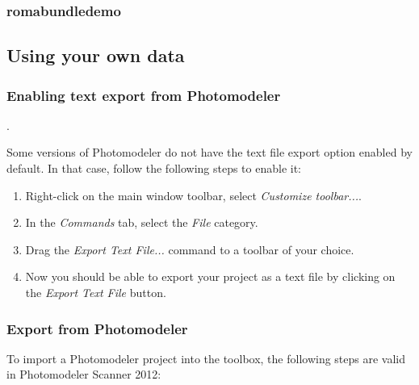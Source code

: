 \documentclass{article}
\begin{document}
\subsubsection{romabundledemo}

\newpage
\subsection{Using your own data}

\subsubsection{Enabling text export from Photomodeler}
\label{sec:enableTextExport}.

Some versions of Photomodeler do not have the text file export option
enabled by default. In that case, follow the following steps to enable
it:
\begin{enumerate}
\item Right-click on the main window toolbar, select \emph{Customize toolbar...}.
\item In the \emph{Commands} tab, select the \emph{File} category.
\item Drag the \emph{Export Text File...} command to a toolbar of
  your choice.
\item Now you should be able to export your project as a text file by
  clicking on the \emph{Export Text File} button.
\end{enumerate}

\subsubsection{Export from Photomodeler}

To import a Photomodeler project into the toolbox, the following
steps are valid in Photomodeler Scanner 2012:
\end{document}
